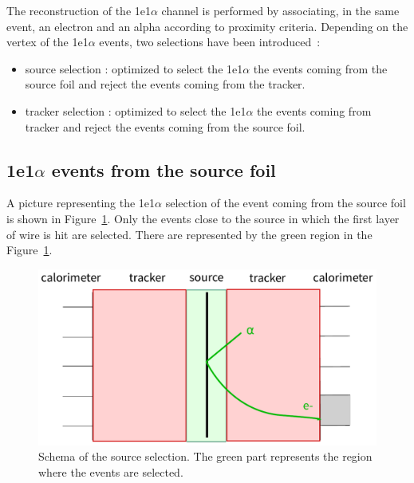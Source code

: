 \documentclass[main.tex]{subfiles}
\begin{document}
\bigskip


\noindent  The reconstruction of the 1e1$\alpha$ channel is performed by associating, in the same event, an electron and an alpha according to proximity criteria. Depending on the vertex of the 1e1$\alpha$ events, two selections have been introduced~: 


\begin{itemize}
\item source selection : optimized to select the 1e1$\alpha$ the events coming from the source foil and reject the events coming from the tracker.

\item tracker selection : optimized to select the 1e1$\alpha$ the events coming from tracker and reject the events coming from the source foil.
\end{itemize}


\subsection{1e1$\alpha$ events from the source foil}


\noindent A picture representing the 1e1$\alpha$ selection of the event coming from the source foil is shown in Figure~\ref{cartoon_source_selection}. Only the events close to the source in which the first layer of wire is hit are selected. There are represented by the green region in the Figure~\ref{cartoon_source_selection}.


\begin{figure}[h!]
\begin{center}
\includegraphics[scale=0.6]{pictures/Chap5/cartoon_source_selection.pdf}
\caption{Schema of the source selection. The green part represents the region where the events are selected.}
\label{cartoon_source_selection}
\end{center}
\end{figure}
\end{document}
